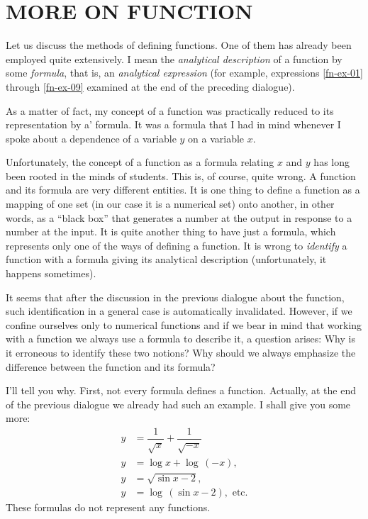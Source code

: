 
\chapter{MORE ON FUNCTION}
\label{more-on-function}
{\parindent=0pt
\athr Let us discuss the methods of defining functions. One of them has already been employed quite extensively. I mean the \emph{analytical description} of a function by some \emph{formula}, that is, an \emph{analytical expression} (for example, expressions \eqref{fn-ex-01} through \eqref{fn-ex-09} examined at the end of the preceding dialogue).

\rdr As a matter of fact, my concept of a function was practically reduced to its representation by a' formula. It was a formula that I had in mind whenever I spoke about a dependence of a variable $y$ on a variable $x$.

\athr Unfortunately, the concept of a function as a formula relating $x$ and $y$ has long been rooted in the minds of students. This is, of course, quite wrong. A function and its formula are very different entities. It is one thing to define a function as a mapping of one set (in our case it is a numerical set) onto another, in other words, as a ``black box'' that generates a number at the output in response to a number at the input. It is quite another thing to have just a formula, which represents only one of the ways of defining a function. It is wrong to \emph{identify} a function with a formula giving its analytical description (unfortunately, it happens sometimes).

\rdr It seems that after the discussion in the previous dialogue about the function, such identification in a general case is automatically invalidated. However, if we confine ourselves only to numerical functions and if we bear in mind that working with a function we always use a formula to describe it, a question arises: Why is it erroneous to identify these two notions? Why should we always emphasize the difference between the function and its formula?

\athr I'll tell you why. First, not every formula defines a function. Actually, at the end of the previous dialogue we already had such an example. I shall give you some more: 
\begin{align*}%
y &= \dfrac{1}{\sqrt{x}} +  \dfrac{1}{\sqrt{-x}}   \\
y &= \log x + \log \, (-x), \\
y & = \sqrt{\sin x - 2}, \\
y & = \log \, (\sin x - 2), \,\, \text{etc.} 
\end{align*}
These formulas do not represent any functions.

}
